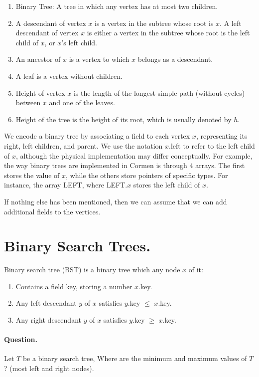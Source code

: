 \begin{definition}
  \begin{enumerate}
    \item Binary Tree: A tree in which any vertex has at most two children.
    \item A descendant of vertex $x$ is a vertex in the subtree whose root is $x$. A left descendant of vertex $x$ is either a vertex in the subtree whose root is the left child of $x$, or $x$'s left child.
    \item An ancestor of $x$ is a vertex to which $x$ belongs as a descendant.
    \item A leaf is a vertex without children.
    \item Height of vertex $x$ is the length of the longest simple path (without cycles) between $x$ and one of the leaves.
    \item Height of the tree is the height of its root, which is usually denoted by $h$.
\end{enumerate}
\end{definition}

We encode a binary tree by associating a field to each vertex $x$, representing its right, left children, and parent. We use the notation $x$.left to refer to the left child of $x$, although the physical implementation may differ conceptually. For example, the way binary trees are implemented in Cormen is through 4 arrays. The first stores the value of $x$, while the others store pointers of specific types. For instance, the array LEFT, where LEFT.$x$ stores the left child of $x$.


If nothing else has been mentioned, then we can assume that we can add additional fields to the vertices.


\section{Binary Search Trees.} Binary search tree (BST) is a binary tree which any node $x$ of it: 
\begin{enumerate}
  \item Contains a field key, storing a number $x$.key. 
  \item Any left descendant $y$ of $x$ satisfies $y$.key $\le$ $x$.key. 
  \item Any right descendant $y$ of $x$ satisfies $y$.key $\ge$ $x$.key. 
\end{enumerate}

\paragraph{Question.} Let $T$ be a binary search tree, Where are the minimum and maximum values of $T$? (most left and right nodes). 

